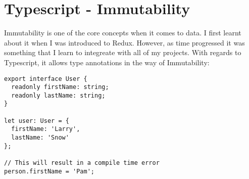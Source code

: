 \maketitle{}
\section{ Typescript - Immutability }
Immutability is one of the core concepts when it comes to data. I first learnt
about it when I was introduced to Redux. However, as time progressed it was
something that I learn to integreate with all of my projects. With regards to
Typescript, it allows type annotations in the way of Immutability:
\begin{lstlisting}
export interface User {
  readonly firstName: string;
  readonly lastName: string;
}

let user: User = {
  firstName: 'Larry',
  lastName: 'Snow'
};

// This will result in a compile time error
person.firstName = 'Pam';

\end{lstlisting}

